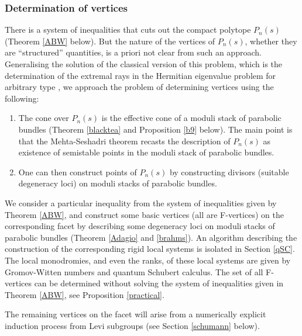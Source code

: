\subsubsection{Determination of vertices}\label{review}
There is a system of inequalities that cuts out the compact polytope $P_n(s)$ (Theorem \ref{ABW}
below). But the nature of the vertices of $P_n(s)$, whether they are ``structured'' quantities, is a priori not clear
from such an approach. Generalising the solution of the classical version of this problem, which is the determination of the extremal rays in the Hermitian eigenvalue problem for arbitrary type \cite{BHermit,BKiers,Kiers}, we approach the problem of determining vertices using the following:
\begin{enumerate}
\item The cone over $P_n(s)$ is the effective cone of a moduli stack of parabolic bundles (Theorem \ref{blacktea} and Proposition \ref{b9} below). The main point is that the Mehta-Seshadri theorem
recasts the description of $P_n(s)$  as existence of semistable points in the moduli stack of parabolic bundles.
\item One can then construct points of $P_n(s)$ by constructing divisors (suitable degeneracy loci)  on moduli stacks of parabolic bundles.
\end{enumerate}
We consider a particular inequality from the system of inequalities given by Theorem \ref{ABW}, and construct some basic vertices (all are F-vertices)  on the corresponding facet  by describing some degeneracy loci on moduli stacks of parabolic bundles (Theorem \ref{Adagio} and \ref{brahms}). An algorithm describing the construction of the corresponding rigid local systems is isolated in Section \ref{qSC}. The local monodromies, and even the ranks, of these local systems are given by Gromov-Witten numbers and quantum Schubert calculus. The set of all F-vertices can be determined without solving the system of inequalities given in Theorem \ref{ABW}, see Proposition \ref{practical}.

The remaining vertices on the facet will arise from a numerically explicit induction process from Levi subgroups (see Section \ref{schumann} below).

